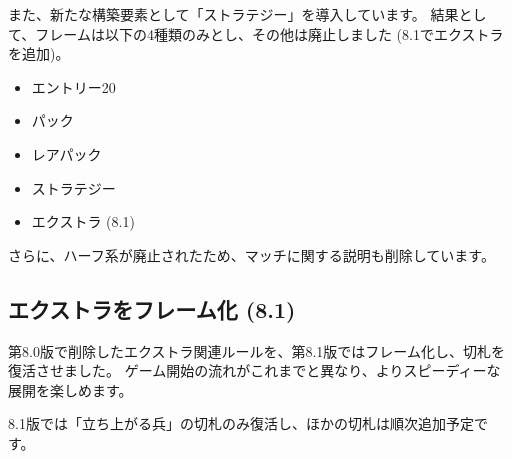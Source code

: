 \documentclass[letterpaper,10pt,dvipdfmx]{sphinxmanual}
\begin{document}
\sphinxAtStartPar
また、新たな構築要素として「ストラテジー」を導入しています。
結果として、フレームは以下の4種類のみとし、その他は廃止しました (8.1でエクストラを追加)。
\begin{itemize}
\item {} 
\sphinxAtStartPar
エントリー20

\item {} 
\sphinxAtStartPar
パック

\item {} 
\sphinxAtStartPar
レアパック

\item {} 
\sphinxAtStartPar
ストラテジー

\item {} 
\sphinxAtStartPar
エクストラ (8.1)

\end{itemize}

\sphinxAtStartPar
さらに、ハーフ系が廃止されたため、マッチに関する説明も削除しています。


\subsection{エクストラをフレーム化 (8.1)}
\label{\detokenize{revision-history/8th:id7}}
\sphinxAtStartPar
第8.0版で削除したエクストラ関連ルールを、第8.1版ではフレーム化し、切札を復活させました。
ゲーム開始の流れがこれまでと異なり、よりスピーディーな展開を楽しめます。

\sphinxAtStartPar
8.1版では「立ち上がる兵」の切札のみ復活し、ほかの切札は順次追加予定です。
\end{document}
